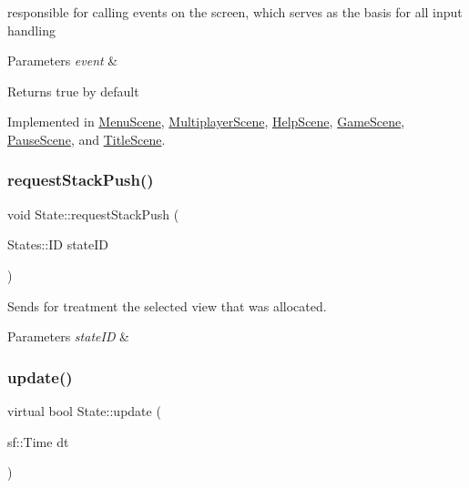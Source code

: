 responsible for calling events on the screen, which serves as the basis for all input handling 


\begin{DoxyParams}{Parameters}
{\em event} & \\
\hline
\end{DoxyParams}
\begin{DoxyReturn}{Returns}
true by default 
\end{DoxyReturn}


Implemented in \hyperlink{classMenuScene_a47f06ae8b2a4830a0a6d104db52fd624}{Menu\+Scene}, \hyperlink{classMultiplayerScene_af2bcc458cda1d272acabc342eb79d25a}{Multiplayer\+Scene}, \hyperlink{classHelpScene_adebdd5586b2e0c618134d5bfc38f821b}{Help\+Scene}, \hyperlink{classGameScene_aa494372b1f451f3c3a268558fddb30f2}{Game\+Scene}, \hyperlink{classPauseScene_ad806125bd5ae985f24ff2cbfffc2c8e7}{Pause\+Scene}, and \hyperlink{classTitleScene_ae965e4a6c1435246fcbdd487bbc58468}{Title\+Scene}.

\mbox{\label{classState_a6763de833ceb9c23df45aff163a4a1cd}} 
\subsubsection{\texorpdfstring{request\+Stack\+Push()}{requestStackPush()}}
{\footnotesize\ttfamily void State\+::request\+Stack\+Push (\begin{DoxyParamCaption}\item[{States\+::\+ID}]{state\+ID }\end{DoxyParamCaption})\hspace{0.3cm}{\ttfamily [protected]}}



Sends for treatment the selected view that was allocated. 


\begin{DoxyParams}{Parameters}
{\em state\+ID} & \\
\hline
\end{DoxyParams}
\mbox{\label{classState_acd5926bc7a373edff9e57f3ffe94ca13}} 
\subsubsection{\texorpdfstring{update()}{update()}}
{\footnotesize\ttfamily virtual bool State\+::update (\begin{DoxyParamCaption}\item[{sf\+::\+Time}]{dt }\end{DoxyParamCaption})\hspace{0.3cm}{\ttfamily [pure virtual]}}



